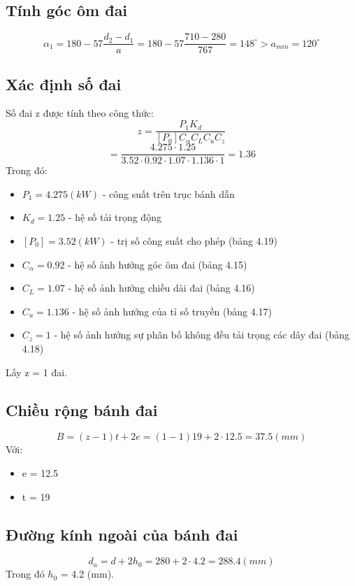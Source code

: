\subsection{Tính góc ôm đai}
\[
    \alpha_1 = 180 - 57\frac{d_2 - d_1}{a} = 180 - 57\frac{710 - 280}{767} = 148^{\circ} > a_{min} = 120^{\circ}
\]

\subsection{Xác định số đai}
Số đai z được tính theo công thức: 
\[
    z = \frac{P_1K_d}{[P_0]C_\alpha C_L C_u C_z}
\]
\[
    = \frac{4.275 \cdot 1.25}{3.52 \cdot 0.92 \cdot 1.07 \cdot 1.136 \cdot 1} = 1.36
\]
Trong đó:
\begin{itemize}
    \item $P_1 = 4.275 (kW)$ - công suất trên trục bánh dẫn
    \item $K_d = 1.25$ - hệ số tải trọng động
    \item $[P_0] = 3.52 (kW)$ - trị số công suất cho phép (bảng 4.19)
    \item $C_\alpha = 0.92$ - hệ số ảnh hưởng góc ôm đai (bảng 4.15)
    \item $C_L = 1.07$ - hệ số ảnh hưởng chiều dài đai (bảng 4.16)
    \item $C_u = 1.136$ - hệ số ảnh hưởng của tỉ số truyền (bảng 4.17)
    \item $C_z = 1$ - hệ số ảnh hưởng sự phân bố không đều tải trọng các dây đai (bảng 4.18)
\end{itemize}   
Lấy z = 1 đai. \\

\subsection{Chiều rộng bánh đai}
\[
    B = (z - 1)t +2e = (1 - 1)19 + 2 \cdot 12.5 = 37.5 (mm)
\]
Với:
\begin{itemize}
    \item e = 12.5 
    \item t = 19
\end{itemize}

\subsection{Đường kính ngoài của bánh đai}
\[
    d_a = d + 2h_0 = 280 + 2 \cdot 4.2 = 288.4 (mm)
\]
Trong đó $h_0$ = 4.2 (mm). \\


